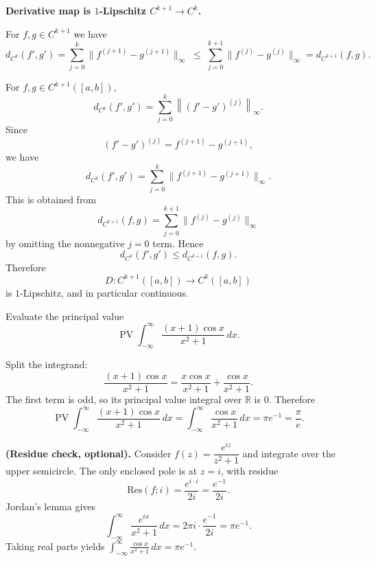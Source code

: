 \begin{problem}[CP-IV-0130]
\label{prob:cp-iv-0130}
\par\noindent\textbullet\quad \textbf{Derivative map is $1$-Lipschitz $C^{k+1}\!\to C^{k}$.}

	For $f,g\in C^{k+1}$ we have
	\[
	d_{C^{k}}(f',g')
	=\sum_{j=0}^{k} \|f^{(j+1)}-g^{(j+1)}\|_\infty
	\;\le\;
	\sum_{j=0}^{k+1} \|f^{(j)}-g^{(j)}\|_\infty
	= d_{C^{k+1}}(f,g).
	\]

	\medskip
\end{problem}

\begin{solution}
For \(f,g\in C^{k+1}([a,b])\),
\[
d_{C^k}(f',g')
=
\sum_{j=0}^{k}
\left\|
(f'-g')^{(j)}
\right\|_\infty.
\]
Since
\[
(f'-g')^{(j)}
=
f^{(j+1)}-g^{(j+1)},
\]
we have
\[
d_{C^k}(f',g')
=
\sum_{j=0}^{k}
\|f^{(j+1)}-g^{(j+1)}\|_\infty.
\]
This is obtained from
\[
d_{C^{k+1}}(f,g)
=
\sum_{j=0}^{k+1}
\|f^{(j)}-g^{(j)}\|_\infty
\]
by omitting the nonnegative \(j=0\) term. Hence
\[
\boxed{
d_{C^k}(f',g')
\le
d_{C^{k+1}}(f,g).
}
\]
Therefore
\[
D:C^{k+1}([a,b])\to C^k([a,b])
\]
is \(1\)-Lipschitz, and in particular continuous.
\end{solution}


\begin{problem}[CP-IV-0131]
\label{prob:cp-iv-0131}
Evaluate the principal value
\[
\operatorname{PV}\int_{-\infty}^{\infty}\frac{(x+1)\cos x}{x^{2}+1}\,dx.
\]
\end{problem}

\begin{solution}
Split the integrand:
\[
\frac{(x+1)\cos x}{x^{2}+1}
=\frac{x\cos x}{x^{2}+1}+\frac{\cos x}{x^{2}+1}.
\]
The first term is odd, so its principal value integral over $\mathbb R$ is $0$.
Therefore
\[
\operatorname{PV}\!\int_{-\infty}^{\infty}\frac{(x+1)\cos x}{x^{2}+1}\,dx
=\int_{-\infty}^{\infty}\frac{\cos x}{x^{2}+1}\,dx
=\pi e^{-1}
=\frac{\pi}{e}.
\]

\par\medskip\noindent\textbf{(Residue check, optional).}
Consider $f(z)=\dfrac{e^{iz}}{z^{2}+1}$ and integrate over the upper semicircle.
The only enclosed pole is at $z=i$, with residue
\[
\mathrm{Res}(f;i)=\frac{e^{i\cdot i}}{2i}=\frac{e^{-1}}{2i}.
\]
Jordan’s lemma gives
\[
\int_{-\infty}^{\infty}\frac{e^{ix}}{x^{2}+1}\,dx=2\pi i\cdot\frac{e^{-1}}{2i}=\pi e^{-1}.
\]
Taking real parts yields $\displaystyle \int_{-\infty}^{\infty}\frac{\cos x}{x^{2}+1}\,dx=\pi e^{-1}$.
\end{solution}

